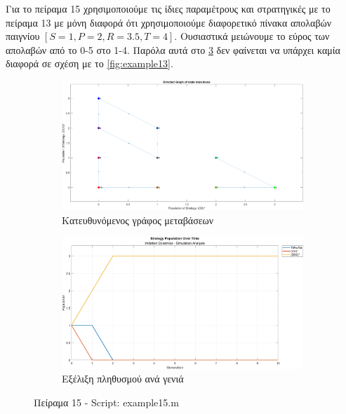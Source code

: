 \documentclass[12pt]{report}
\begin{document}
Για το πείραμα 15 χρησιμοποιούμε τις ίδιες παραμέτρους και στρατηγικές με το πείραμα 13 με μόνη διαφορά ότι χρησιμοποιούμε διαφορετικό πίνακα απολαβών παιγνίου $[S=1, P=2, R=3.5, T=4]$. Ουσιαστικά μειώνουμε το εύρος των απολαβών από το 0-5 στο 1-4. Παρόλα αυτά στο \ref{fig:example15} δεν φαίνεται να υπάρχει καμία διαφορά σε σχέση με το \ref{fig:example13}.
\begin{figure}[H]
    \centering

    \begin{subfigure}[b]{0.45\textwidth}
        \includegraphics[width=\linewidth]{Figures Imitation Dynamics/example15.png}
        \caption{Κατευθυνόμενος γράφος μεταβάσεων}
        \label{fig:fig15}
    \end{subfigure}
    \hfill
    \begin{subfigure}[b]{0.45\textwidth}
        \includegraphics[width=\linewidth]{Figures Imitation Dynamics/example15-sim.png}
        \caption{Εξέλιξη πληθυσμού ανά γενιά}
        \label{fig:fig15-sim}
    \end{subfigure}

    \caption{Πείραμα 15 - \foreignlanguage{english}{Script: example15.m}}
    \label{fig:example15}
\end{figure}
\end{document}
